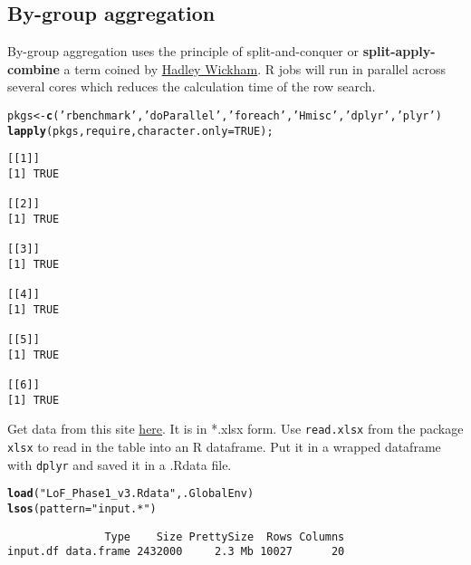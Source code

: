 \documentclass[9pt,english]{extarticle}\usepackage[]{graphicx}\usepackage[]{color}
\makeatletter
\newcommand{\hlnum}[1]{\textcolor[rgb]{0.686,0.059,0.569}{#1}}%
\newcommand{\hlstr}[1]{\textcolor[rgb]{0.192,0.494,0.8}{#1}}%
\newcommand{\hlstd}[1]{\textcolor[rgb]{0.345,0.345,0.345}{#1}}%
\newcommand{\hlkwb}[1]{\textcolor[rgb]{0.69,0.353,0.396}{#1}}%
\newcommand{\hlkwc}[1]{\textcolor[rgb]{0.333,0.667,0.333}{#1}}%
\newcommand{\hlkwd}[1]{\textcolor[rgb]{0.737,0.353,0.396}{\textbf{#1}}}%
\newenvironment{kframe}{%
 \def\at@end@of@kframe{}%
 \ifinner\ifhmode%
  \def\at@end@of@kframe{\end{minipage}}%
  \begin{minipage}{\columnwidth}%
 \fi\fi%
 \def\FrameCommand##1{\hskip\@totalleftmargin \hskip-\fboxsep
 \colorbox{shadecolor}{##1}\hskip-\fboxsep
     \hskip-\linewidth \hskip-\@totalleftmargin \hskip\columnwidth}%
 \MakeFramed {\advance\hsize-\width
   \@totalleftmargin\z@ \linewidth\hsize
   \@setminipage}}%
 {\par\unskip\endMakeFramed%
 \at@end@of@kframe}
\newenvironment{knitrout}{}{} %
\makeatother
\begin{document}
\begin{linenumbers}
\section{By-group aggregation}
\label{sec:aggregation}

By-group aggregation uses the principle of split-and-conquer or \textbf{split-apply-combine} a term coined by \href{http://goo.gl/qZIQ8I}{Hadley Wickham}. R jobs will run in parallel across several cores which reduces the calculation time of the row search.
\begin{knitrout}
\color{fgcolor}\begin{kframe}
\begin{alltt}
\hlstd{pkgs} \hlkwb{<-} \hlkwd{c}\hlstd{(}\hlstr{'rbenchmark'}\hlstd{,} \hlstr{'doParallel'}\hlstd{,} \hlstr{'foreach'}\hlstd{,} \hlstr{'Hmisc'}\hlstd{,} \hlstr{'dplyr'}\hlstd{,} \hlstr{'plyr'}\hlstd{)}
\hlkwd{lapply}\hlstd{(pkgs, require,} \hlkwc{character.only} \hlstd{=} \hlnum{TRUE}\hlstd{);}
\end{alltt}
\begin{verbatim}
[[1]]
[1] TRUE

[[2]]
[1] TRUE

[[3]]
[1] TRUE

[[4]]
[1] TRUE

[[5]]
[1] TRUE

[[6]]
[1] TRUE
\end{verbatim}
\end{kframe}
\end{knitrout}

Get data from this site \href{http://goo.gl/nB0gAH}{here}. It is in *.xlsx form. Use \verb|read.xlsx| from the package \verb|xlsx| to read in the table into an R dataframe. Put it in a wrapped dataframe with \verb|dplyr| and saved it in a .Rdata file.
\begin{knitrout}
\color{fgcolor}\begin{kframe}
\begin{alltt}
\hlkwd{load}\hlstd{(}\hlstr{"LoF_Phase1_v3.Rdata"}\hlstd{, .GlobalEnv)}
\hlkwd{lsos}\hlstd{(}\hlkwc{pattern}\hlstd{=}\hlstr{"input.*"}\hlstd{)}
\end{alltt}
\begin{verbatim}
               Type    Size PrettySize  Rows Columns
input.df data.frame 2432000     2.3 Mb 10027      20
\end{verbatim}
\end{kframe}
\end{knitrout}



\end{linenumbers}
\end{document}
